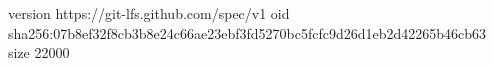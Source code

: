 version https://git-lfs.github.com/spec/v1
oid sha256:07b8ef32f8cb3b8e24c66ae23ebf3fd5270bc5fcfc9d26d1eb2d42265b46cb63
size 22000
